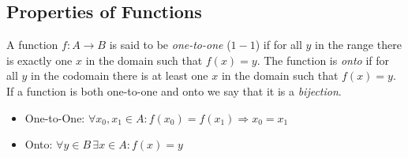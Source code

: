 \clearpage

\subsection*{Properties of Functions}

\begin{defn}
    A function \(f:A\longrightarrow B\) is said to be \emph{one-to-one} (\(1-1\)) if for all \(y\) in the range there is exactly one \(x\) in the domain such that \(f(x)=y\).  The function is \emph{onto} if for all \(y\) in the codomain there is at least one \(x\) in the domain such that \(f(x)=y\).  If a function is both one-to-one and onto we say that it is a \emph{bijection}.
    \begin{itemize}
        \item One-to-One: \(\forall x_0,x_1\in A: f(x_0)=f(x_1) \Longrightarrow x_0=x_1\)
        \item Onto: \(\forall y\in B\, \exists x\in A: f(x)=y\)
    \end{itemize}
\end{defn}


